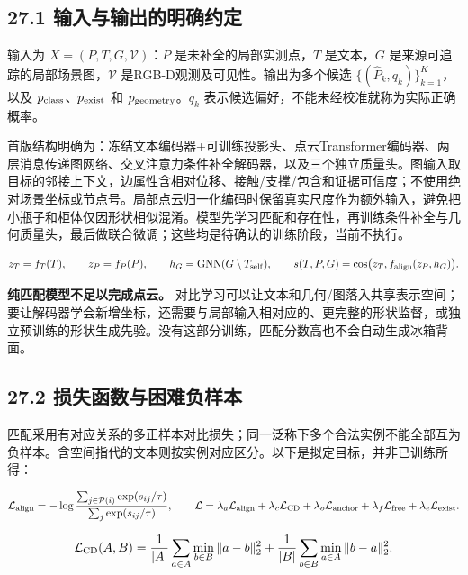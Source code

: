 \documentclass[UTF8,fontset=fandol]{ctexart}
\begin{document}
\subsection*{27.1 输入与输出的明确约定}

输入为 $X=(P,T,G,\mathcal V)$：$P$ 是未补全的局部实测点，$T$ 是文本，$G$ 是来源可追踪的局部场景图，$\mathcal V$ 是RGB-D观测及可见性。输出为多个候选 $\{(\widehat P_k,q_k)\}_{k=1}^K$，以及 $p_{\rm class}$、$p_{\rm exist}$ 和 $p_{\rm geometry}$。$q_k$ 表示候选偏好，不能未经校准就称为实际正确概率。



首版结构明确为：冻结文本编码器+可训练投影头、点云Transformer编码器、两层消息传递图网络、交叉注意力条件补全解码器，以及三个独立质量头。图输入取目标的邻接上下文，边属性含相对位移、接触/支撑/包含和证据可信度；不使用绝对场景坐标或节点号。局部点云归一化编码时保留真实尺度作为额外输入，避免把小瓶子和柜体仅因形状相似混淆。模型先学习匹配和存在性，再训练条件补全与几何质量头，最后做联合微调；这些均是待确认的训练阶段，当前不执行。



\[
z_T=f_T(T),\qquad z_P=f_P(P),\qquad h_G={\rm GNN}(G\setminus T_{\rm self}),
\qquad s(T,P,G)=\cos\bigl(z_T,f_{\rm align}(z_P,h_G)\bigr).
\]

\textbf{纯匹配模型不足以完成点云。} 对比学习可以让文本和几何/图落入共享表示空间；要让解码器学会新增坐标，还需要与局部输入相对应的、更完整的形状监督，或独立预训练的形状生成先验。没有这部分训练，匹配分数高也不会自动生成冰箱背面。



\subsection*{27.2 损失函数与困难负样本}

匹配采用有对应关系的多正样本对比损失；同一泛称下多个合法实例不能全部互为负样本。含空间指代的文本则按实例对应区分。以下是拟定目标，并非已训练所得：



\[
\mathcal L_{\rm align}=-\log\frac{\sum_{j\in\mathcal P(i)}\exp(s_{ij}/\tau)}{\sum_j\exp(s_{ij}/\tau)},\qquad
\mathcal L=\lambda_a\mathcal L_{\rm align}+\lambda_c\mathcal L_{\rm CD}
+\lambda_o\mathcal L_{\rm anchor}+\lambda_f\mathcal L_{\rm free}+\lambda_e\mathcal L_{\rm exist}.
\]

\[
\mathcal L_{\rm CD}(A,B)=\frac1{|A|}\sum_{a\in A}\min_{b\in B}\|a-b\|_2^2+
\frac1{|B|}\sum_{b\in B}\min_{a\in A}\|b-a\|_2^2.
\]
\end{document}

